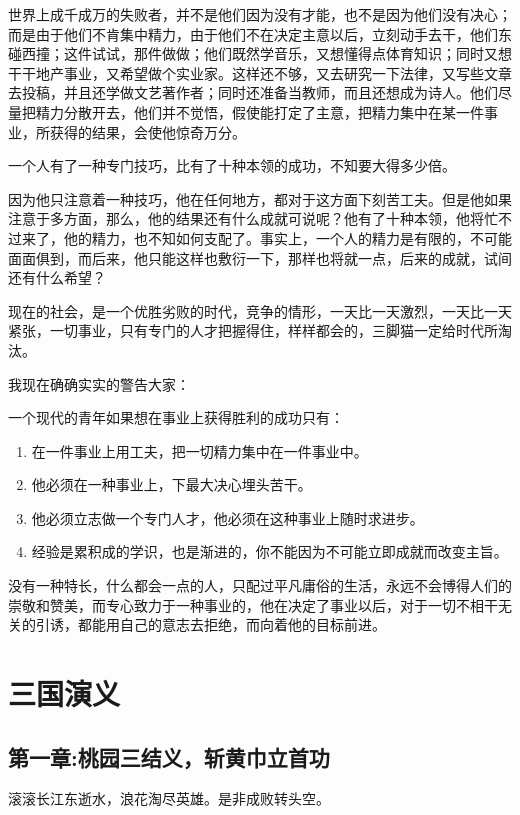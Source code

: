 \documentclass[UTF8,a4paper,8pt]{ctexart}
\begin{document}
		
		世界上成千成万的失败者，并不是他们因为没有才能，也不是因为他们没有决心；而是由于他们不肯集中精力，由于他们不在决定主意以后，立刻动手去干，他们东碰西撞；这件试试，那件做做；他们既然学音乐，又想懂得点体育知识；同时又想干干地产事业，又希望做个实业家。这样还不够，又去研究一下法律，又写些文章去投稿，并且还学做文艺著作者；同时还准备当教师，而且还想成为诗人。他们尽量把精力分散开去，他们并不觉悟，假使能打定了主意，把精力集中在某一件事业，所获得的结果，会使他惊奇万分。
		
		
		一个人有了一种专门技巧，比有了十种本领的成功，不知要大得多少倍。
		
		
		因为他只注意着一种技巧，他在任何地方，都对于这方面下刻苦工夫。但是他如果注意于多方面，那么，他的结果还有什么成就可说呢？他有了十种本领，他将忙不过来了，他的精力，也不知如何支配了。事实上，一个人的精力是有限的，不可能面面俱到，而后来，他只能这样也敷衍一下，那样也将就一点，后来的成就，试间还有什么希望？
		
		
		现在的社会，是一个优胜劣败的时代，竞争的情形，一天比一天激烈，一天比一天紧张，一切事业，只有专门的人才把握得住，样样都会的，三脚猫一定给时代所淘汰。
		
		
		我现在确确实实的警告大家：
		
		
		一个现代的青年如果想在事业上获得胜利的成功只有：
		
		\begin{enumerate}
			\item 在一件事业上用工夫，把一切精力集中在一件事业中。
			\item 他必须在一种事业上，下最大决心埋头苦干。
			\item 他必须立志做一个专门人才，他必须在这种事业上随时求进步。
			\item 经验是累积成的学识，也是渐进的，你不能因为不可能立即成就而改变主旨。
		\end{enumerate}
		
		没有一种特长，什么都会一点的人，只配过平凡庸俗的生活，永远不会博得人们的崇敬和赞美，而专心致力于一种事业的，他在决定了事业以后，对于一切不相干无关的引诱，都能用自己的意志去拒绝，而向着他的目标前进。 	
	
	\section{三国演义}
		\subsection{第一章:桃园三结义，斩黄巾立首功}
			滚滚长江东逝水，浪花淘尽英雄。是非成败转头空。
			
\end{document}
